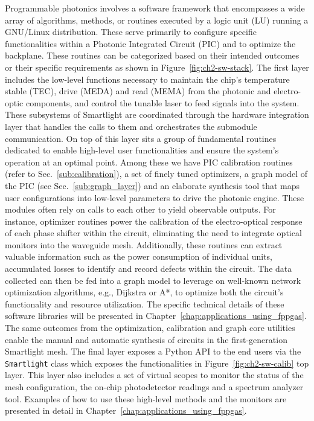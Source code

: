 Programmable photonics involves a software framework that encompasses a wide array of algorithms, methods, or routines executed by a logic unit (LU) running a GNU/Linux distribution.
These serve primarily to configure specific functionalities within a Photonic Integrated Circuit (PIC) and to optimize the backplane.
These routines can be categorized based on their intended outcomes or their specific requirements as shown in Figure~\ref{fig:ch2-sw-stack}.
The first layer includes the low-level functions necessary to maintain the chip's temperature stable (TEC), drive (MEDA) and read (MEMA) from the photonic and electro-optic components, and control the tunable laser to feed signals into the system.
These subsystems of Smartlight are coordinated through the hardware integration layer that handles the calls to them and orchestrates the submodule communication.
On top of this layer sits a group of fundamental routines dedicated to enable high-level user functionalities and ensure the system's operation at an optimal point.
Among these we have PIC calibration routines (refer to Sec.~\ref{sub:calibration}), a set of finely tuned optimizers, a graph model of the PIC (see Sec.~\ref{sub:graph_layer}) and an elaborate synthesis tool that maps user configurations into low-level parameters to drive the photonic engine.
These modules often rely on calls to each other to yield observable outputs.
For instance, optimizer routines power the calibration of the electro-optical response of each phase shifter within the circuit, eliminating the need to integrate optical monitors into the waveguide mesh.
Additionally, these routines can extract valuable information such as the power consumption of individual units, accumulated losses to identify and record defects within the circuit.
The data collected can then be fed into a graph model to leverage on well-known network optimization algorithms, e.g., Dijkstra or A*, to optimize both the circuit's functionality and resource utilization.
The specific technical details of these software libraries will be presented in Chapter~\ref{chap:applications_using_fppgas}.
The same outcomes from the optimization, calibration and graph core utilities enable the manual and automatic synthesis of circuits in the first-generation Smartlight mesh.
The final layer exposes a Python API to the end users via the \lstinline|Smartlight| class which exposes the functionalities in Figure~\ref{fig:ch2-sw-calib} top layer.
This layer also includes a set of virtual scopes to monitor the status of the mesh configuration, the on-chip photodetector readings and a spectrum analyzer tool.
Examples of how to use these high-level methods and the monitors are presented in detail in Chapter~\ref{chap:applications_using_fppgas}.

